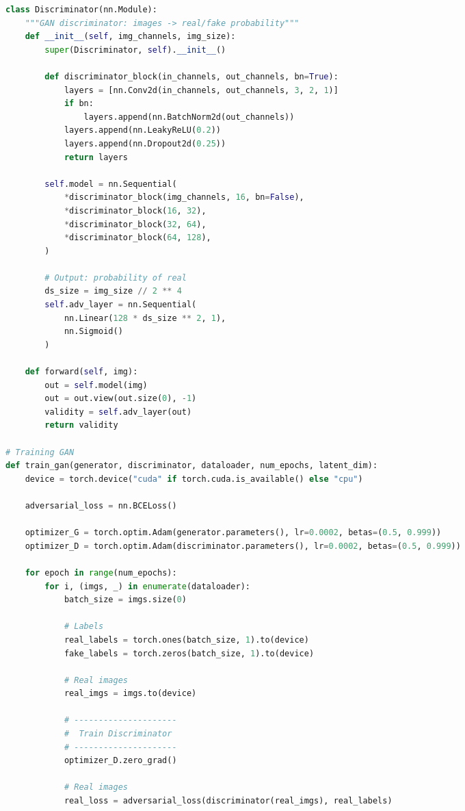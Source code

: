 \documentclass[8pt,landscape]{article}
\begin{document}
\begin{multicols}{3}
\begin{lstlisting}[language=Python]
class Discriminator(nn.Module):
    """GAN discriminator: images -> real/fake probability"""
    def __init__(self, img_channels, img_size):
        super(Discriminator, self).__init__()

        def discriminator_block(in_channels, out_channels, bn=True):
            layers = [nn.Conv2d(in_channels, out_channels, 3, 2, 1)]
            if bn:
                layers.append(nn.BatchNorm2d(out_channels))
            layers.append(nn.LeakyReLU(0.2))
            layers.append(nn.Dropout2d(0.25))
            return layers

        self.model = nn.Sequential(
            *discriminator_block(img_channels, 16, bn=False),
            *discriminator_block(16, 32),
            *discriminator_block(32, 64),
            *discriminator_block(64, 128),
        )

        # Output: probability of real
        ds_size = img_size // 2 ** 4
        self.adv_layer = nn.Sequential(
            nn.Linear(128 * ds_size ** 2, 1),
            nn.Sigmoid()
        )

    def forward(self, img):
        out = self.model(img)
        out = out.view(out.size(0), -1)
        validity = self.adv_layer(out)
        return validity

# Training GAN
def train_gan(generator, discriminator, dataloader, num_epochs, latent_dim):
    device = torch.device("cuda" if torch.cuda.is_available() else "cpu")

    adversarial_loss = nn.BCELoss()

    optimizer_G = torch.optim.Adam(generator.parameters(), lr=0.0002, betas=(0.5, 0.999))
    optimizer_D = torch.optim.Adam(discriminator.parameters(), lr=0.0002, betas=(0.5, 0.999))

    for epoch in range(num_epochs):
        for i, (imgs, _) in enumerate(dataloader):
            batch_size = imgs.size(0)

            # Labels
            real_labels = torch.ones(batch_size, 1).to(device)
            fake_labels = torch.zeros(batch_size, 1).to(device)

            # Real images
            real_imgs = imgs.to(device)

            # ---------------------
            #  Train Discriminator
            # ---------------------
            optimizer_D.zero_grad()

            # Real images
            real_loss = adversarial_loss(discriminator(real_imgs), real_labels)


\end{lstlisting}
\end{multicols}
\end{document}
